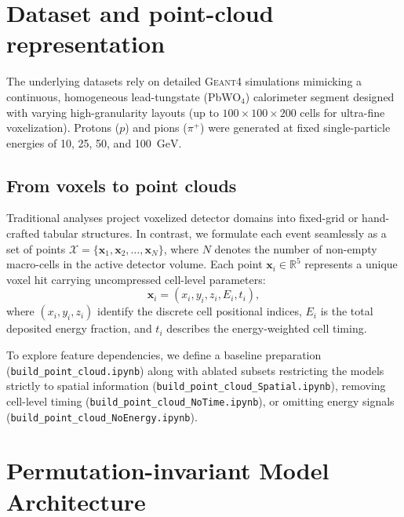 \documentclass[11pt,a4paper]{article}
\newcommand{\GeV}{\ensuremath{\mathrm{GeV}}\xspace}
\begin{document}
\section{Dataset and point-cloud representation}
\label{sec:data}
The underlying datasets rely on detailed \textsc{Geant4} simulations mimicking a continuous, homogeneous lead-tungstate (PbWO$_4$) calorimeter segment designed with varying high-granularity layouts (up to $100 \times 100 \times 200$ cells for ultra-fine voxelization). Protons ($p$) and pions ($\pi^+$) were generated at fixed single-particle energies of 10, 25, 50, and 100~\GeV.

\subsection{From voxels to point clouds}
Traditional analyses project voxelized detector domains into fixed-grid or hand-crafted tabular structures. In contrast, we formulate each event seamlessly as a set of points 
$\mathcal{X} = \{\mathbf{x}_1, \mathbf{x}_2, \dots, \mathbf{x}_N\}$, where $N$ denotes the number of non-empty macro-cells in the active detector volume. 
Each point $\mathbf{x}_i \in \mathbb{R}^5$ represents a unique voxel hit carrying uncompressed cell-level parameters:
\begin{equation}
    \mathbf{x}_i = \left( x_i, y_i, z_i, E_i, t_i \right),
\end{equation}
where $(x_i, y_i, z_i)$ identify the discrete cell positional indices, $E_i$ is the total deposited energy fraction, and $t_i$ describes the energy-weighted cell timing. 

To explore feature dependencies, we define a baseline preparation (\texttt{build\_point\_cloud.ipynb}) along with ablated subsets restricting the models strictly to spatial information (\texttt{build\_point\_cloud\_Spatial.ipynb}), removing cell-level timing (\texttt{build\_point\_cloud\_NoTime.ipynb}), or omitting energy signals (\texttt{build\_point\_cloud\_NoEnergy.ipynb}).

\section{Permutation-invariant Model Architecture}
\label{sec:model}
\end{document}
